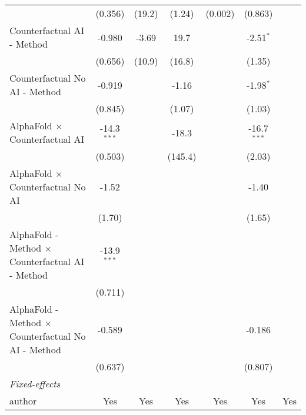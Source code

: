 \begin{tabular}{lcccccc}
                                                              & (0.356)       & (19.2)        & (1.24)       & (0.002)        & (0.863)       &   \\   
   Counterfactual AI - Method                                 & -0.980        & -3.69         & 19.7         &                & -2.51$^{*}$   &   \\   
                                                              & (0.656)       & (10.9)        & (16.8)       &                & (1.35)        &   \\   
   Counterfactual No AI - Method                              & -0.919        &               & -1.16        &                & -1.98$^{*}$   &   \\   
                                                              & (0.845)       &               & (1.07)       &                & (1.03)        &   \\   
   AlphaFold $\times$ Counterfactual AI                       & -14.3$^{***}$ &               & -18.3        &                & -16.7$^{***}$ &   \\   
                                                              & (0.503)       &               & (145.4)      &                & (2.03)        &   \\   
   AlphaFold $\times$ Counterfactual No AI                    & -1.52         &               &              &                & -1.40         &   \\   
                                                              & (1.70)        &               &              &                & (1.65)        &   \\   
   AlphaFold - Method $\times$ Counterfactual AI - Method     & -13.9$^{***}$ &               &              &                &               &   \\   
                                                              & (0.711)       &               &              &                &               &   \\   
   AlphaFold - Method $\times$ Counterfactual No AI - Method  & -0.589        &               &              &                & -0.186        &   \\   
                                                              & (0.637)       &               &              &                & (0.807)       &   \\   
   \midrule
   \emph{Fixed-effects}\\
   author                                                     & Yes           & Yes           & Yes          & Yes            & Yes           & Yes\\  

\end{tabular}
